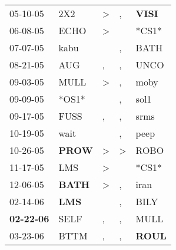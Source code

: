 \begin{supertabular}{p{0.07\textwidth}p{0.06\textwidth}p{0.02\textwidth}p{0.02\textwidth}p{0.06\textwidth}}
          05-10-05\textsuperscript{} &            2X2\textsuperscript{} &     \textgreater &                , &  \textbf{VISI\textsuperscript{}} \\
          06-08-05\textsuperscript{} &           ECHO\textsuperscript{} &     \textgreater &                  &                            *CS1* \\
          07-07-05\textsuperscript{} &           kabu\textsuperscript{} &                  &                , &           BATH\textsuperscript{} \\
          08-21-05\textsuperscript{} &            AUG\textsuperscript{} &                , &                , &           UNCO\textsuperscript{} \\
          09-03-05\textsuperscript{} &           MULL\textsuperscript{} &     \textgreater &                , &           moby\textsuperscript{} \\
          09-09-05\textsuperscript{} &                            *OS1* &                  &                , &           sol1\textsuperscript{} \\
          09-17-05\textsuperscript{} &           FUSS\textsuperscript{} &                , &                , &           srms\textsuperscript{} \\
          10-19-05\textsuperscript{} &           wait\textsuperscript{} &                  &                , &           peep\textsuperscript{} \\
          10-26-05\textsuperscript{} &  \textbf{PROW\textsuperscript{}} &     \textgreater &     \textgreater &           ROBO\textsuperscript{} \\
          11-17-05\textsuperscript{} &            LMS\textsuperscript{} &     \textgreater &                  &                            *CS1* \\
          12-06-05\textsuperscript{} &  \textbf{BATH\textsuperscript{}} &     \textgreater &                , &           iran\textsuperscript{} \\
          02-14-06\textsuperscript{} &   \textbf{LMS\textsuperscript{}} &                  &                , &           BILY\textsuperscript{} \\
 \textbf{02-22-06\textsuperscript{}} &           SELF\textsuperscript{} &                , &                , &           MULL\textsuperscript{} \\
          03-23-06\textsuperscript{} &           BTTM\textsuperscript{} &                , &                , &  \textbf{ROUL\textsuperscript{}} \\

\end{supertabular}
